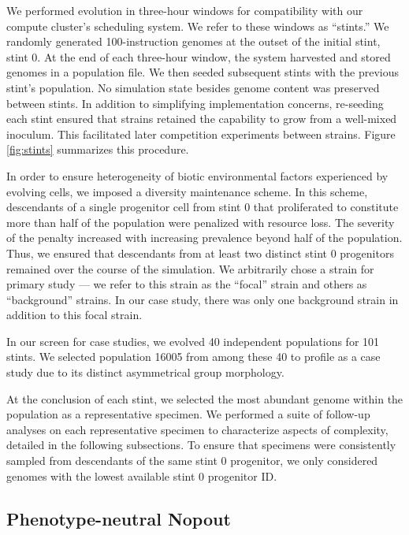 

We performed evolution in three-hour windows for compatibility with our compute cluster's scheduling system.
We refer to these windows as ``stints.''
We randomly generated 100-instruction genomes at the outset of the initial stint, stint 0.
At the end of each three-hour window, the system harvested and stored genomes in a population file.
We then seeded subsequent stints with the previous stint's population.
No simulation state besides genome content was preserved between stints.
In addition to simplifying implementation concerns, re-seeding each stint ensured that strains retained the capability to grow from a well-mixed inoculum.
This facilitated later competition experiments between strains.
Figure \ref{fig:stints} summarizes this procedure.

In order to ensure heterogeneity of biotic environmental factors experienced by evolving cells, we imposed a diversity maintenance scheme.
In this scheme, descendants of a single progenitor cell from stint 0 that proliferated to constitute more than half of the population were penalized with resource loss.
The severity of the penalty increased with increasing prevalence beyond half of the population.
Thus, we ensured that descendants from at least two distinct stint 0 progenitors remained over the course of the simulation.
We arbitrarily chose a strain for primary study --- we refer to this strain as the ``focal'' strain and others as ``background'' strains.
In our case study, there was only one background strain in addition to this focal strain.

In our screen for case studies, we evolved 40 independent populations for 101 stints.
We selected population 16005 from among these 40 to profile as a case study due to its distinct asymmetrical group morphology.

At the conclusion of each stint, we selected the most abundant genome within the population as a representative specimen.
We performed a suite of follow-up analyses on each representative specimen to characterize aspects of complexity, detailed in the following subsections.
To ensure that specimens were consistently sampled from descendants of the same stint 0 progenitor, we only considered genomes with the lowest available stint 0 progenitor ID.

\subsection{Phenotype-neutral Nopout}
\label{sec:phenotype_neutral_nopout}

